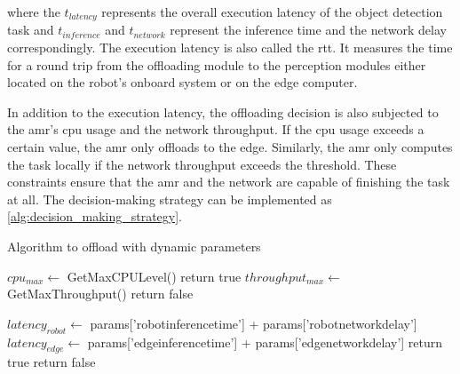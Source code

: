 where the $t_{latency}$ represents the overall execution latency of the object detection task and $t_{inference}$ and $t_{network}$ represent the inference time and the network delay correspondingly. The execution latency is also called the \acrlong{rtt}. It measures the time for a round trip from the offloading module to the perception modules either located on the robot's onboard system or on the edge computer. 

In addition to the execution latency, the offloading decision is also subjected to the \gls{amr}'s \gls{cpu} usage and the network throughput. If the \gls{cpu} usage exceeds a certain value, the \gls{amr} only offloads to the edge. Similarly, the \gls{amr} only computes the task locally if the network throughput exceeds the threshold. These constraints ensure that the \gls{amr} and the network are capable of finishing the task at all. The decision-making strategy can be implemented as \cref{alg:decision_making_strategy}.

\begin{algorithm}[htp]
\caption{Algorithm to offload with dynamic parameters}\label{alg:decision_making_strategy}
\begin{algorithmic}[1]
        \State $cpu_{max} \gets$ GetMaxCPULevel()
            \State return true 
        \EndIf
        \State $throughput_{max} \gets$ GetMaxThroughput()
            \State return false 
        \EndIf
        
        \State $latency_{robot} \gets $ params['robot\textunderscore inference\textunderscore time'] + params['robot\textunderscore network\textunderscore delay']
        \State $latency_{edge} \gets $ params['edge\textunderscore inference\textunderscore time'] + params['edge\textunderscore network\textunderscore delay']
            \State return true 
        \Else
            \State return false 
        \EndIf
    \EndFunction
\end{algorithmic}
\end{algorithm}
